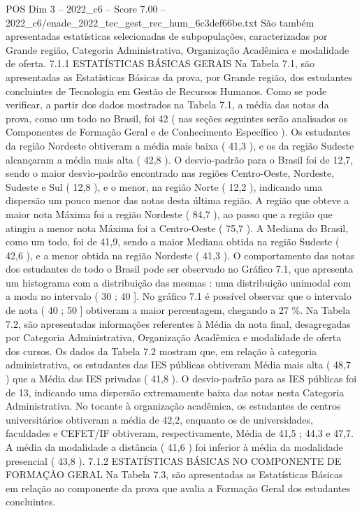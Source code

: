 \begin{textsample}{POS Dim 3 – 2022\_c6 – Score 7.00 – 2022\_c6/enade\_2022\_tec\_gest\_rec\_hum\_6c3def66be.txt}
São também apresentadas estatísticas selecionadas de subpopulações, caracterizadas por Grande região, Categoria Administrativa, Organização Acadêmica e modalidade de oferta. 7.1.1 ESTATÍSTICAS BÁSICAS GERAIS Na Tabela 7.1, são apresentadas as Estatísticas Básicas da prova, por Grande região, dos estudantes concluintes de Tecnologia em Gestão de Recursos Humanos.
Como se pode verificar, a partir dos dados mostrados na Tabela 7.1, a média das notas da prova, como um todo no Brasil, foi 42 ( nas seções seguintes serão analisados os Componentes de Formação Geral e de Conhecimento Específico ).
Os estudantes da região Nordeste obtiveram a média mais baixa ( 41,3 ), e os da região Sudeste alcançaram a média mais alta ( 42,8 ).
O desvio-padrão para o Brasil foi de 12,7, sendo o maior desvio-padrão encontrado nas regiões Centro-Oeste, Nordeste, Sudeste e Sul ( 12,8 ), e o menor, na região Norte ( 12,2 ), indicando uma dispersão um pouco menor das notas desta última região.
A região que obteve a maior nota Máxima foi a região Nordeste ( 84,7 ), ao passo que a região que atingiu a menor nota Máxima foi a Centro-Oeste ( 75,7 ).
A Mediana do Brasil, como um todo, foi de 41,9, sendo a maior Mediana obtida na região Sudeste ( 42,6 ), e a menor obtida na região Nordeste ( 41,3 ).
O comportamento das notas dos estudantes de todo o Brasil pode ser observado no Gráfico 7.1, que apresenta um histograma com a distribuição das mesmas : uma distribuição unimodal com a moda no intervalo ( 30 ; 40 ].
No gráfico 7.1 é possível observar que o intervalo de nota ( 40 ; 50 ] obtiveram a maior percentagem, chegando a 27 \%.
Na Tabela 7.2, são apresentadas informações referentes à Média da nota final, desagregadas por Categoria Administrativa, Organização Acadêmica e modalidade de oferta dos cursos.
Os dados da Tabela 7.2 mostram que, em relação à categoria administrativa, os estudantes das IES públicas obtiveram Média mais alta ( 48,7 ) que a Média das IES privadas ( 41,8 ).
O desvio-padrão para as IES públicas foi de 13, indicando uma dispersão extremamente baixa das notas nesta Categoria Administrativa.
No tocante à organização acadêmica, os estudantes de centros universitários obtiveram a média de 42,2, enquanto os de universidades, faculdades e CEFET/IF obtiveram, respectivamente, Média de 41,5 ; 44,3 e 47,7.
A média da modalidade a distância ( 41,6 ) foi inferior à média da modalidade presencial ( 43,8 ). 7.1.2 ESTATÍSTICAS BÁSICAS NO COMPONENTE DE FORMAÇÃO GERAL Na Tabela 7.3, são apresentadas as Estatísticas Básicas em relação ao componente da prova que avalia a Formação Geral dos estudantes concluintes.

\end{textsample}
